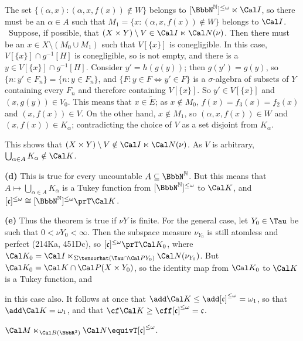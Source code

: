{The set $\{(\alpha,x):(\alpha,x,f(x))\notin W\}$ belongs to
$[\NN]^{\le\omega}\ltimes\Cal I$, so there must be an $\alpha\in A$ such
that $M_1=\{x:(\alpha,x,f(x))\notin W\}$ belongs
to $\Cal I$.   \Quer\ Suppose, if possible, that
$(X\times Y)\setminus V\in\Cal I\ltimes\Cal N(\nu)$.
Then there must be an $x\in X\setminus(M_0\cup M_1)$
such that $V[\{x\}]$ is conegligible.   In this case,
$V[\{x\}]\cap g^{-1}[H]$ is conegligible, so is not empty, and there
is a $y\in V[\{x\}]\cap g^{-1}[H]$.   Consider
$y'=h(g(y))$;  then $g(y')=g(y)$, so $\{n:y'\in F_n\}=\{n:y\in F_n\}$,
and $\{F:y\in F\iff y'\in F\}$ is a $\sigma$-algebra of subsets of $Y$
containing every $F_n$ and therefore
containing $V[\{x\}]$.   So $y'\in V[\{x\}]$ and $(x,g(y))\in V_0$.
This means that $x\in\tilde E$;  as $x\notin M_0$, $f(x)=f_3(x)=f_2(x)$
and $(x,f(x))\in V$.   On the other
hand, $x\notin M_1$, so $(\alpha,x,f(x))\in W$ and $(x,f(x))\in
K_{\alpha}$;  contradicting the choice of $V$ as a set disjoint from
$K_{\alpha}$.\ \Bang

This shows that $(X\times Y)\setminus V\notin\Cal I\ltimes\Cal N(\nu)$.
As $V$ is arbitrary, $\bigcup_{\alpha\in A}K_{\alpha}\notin\Cal K$.

\medskip

{\bf (d)} This is true for every uncountable $A\subseteq\NN$.   But this
means that $A\mapsto\bigcup_{\alpha\in A}K_{\alpha}$ is a Tukey function
from $[\NN]^{\le\omega}$ to
$\Cal K$, and $[\frak c]^{\le\omega}\cong[\NN]^{\le\omega}\prT\Cal K$.

\medskip

{\bf (e)} Thus the theorem is true if $\nu Y$ is finite.   For the
general case, let $Y_0\in\Tau$ be such that $0<\nu Y_0<\infty$.
Then the subspace measure $\nu_{Y_0}$ is still atomless and perfect
(214Ka, 451Dc), so $[\frak c]^{\le\omega}\prT\Cal K_0$, where
$\Cal K_0=\Cal I\ltimes_{\Sigma\tensorhat(\Tau\cap\Cal PY_0)}
\Cal N(\nu_{Y_0})$.
But $\Cal K_0=\Cal K\cap\Cal P(X\times Y_0)$,
so the identity map from $\Cal K_0$ to
$\Cal K$ is a Tukey function, and


\noindent in this case also.
It follows at once that $\add\Cal K\le\add[\frak c]^{\le\omega}=\omega_1$,
so that $\add\Cal K=\omega_1$, and that
$\cf\Cal K\ge\cff[\frak c]^{\le\omega}=\frak c$.
}%

 $\Cal M\ltimes_{\Cal B(\BbbR^2)}\Cal N
\equivT[\frak c]^{\le\omega}$.

